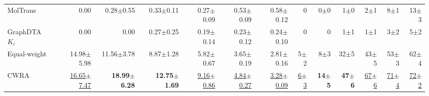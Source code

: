 \begin{table}[htbp!]
\begin{tabular}{lrrrrrr|rrrrrr}
MolTrans & 0.00 & 0.28$\pm$0.55 & 0.33$\pm$0.11 & 0.27$\pm$0.09 & 0.53$\pm$0.09 & 0.58$\pm$0.12 & 0 & 0$\pm$0 & 1$\pm$0 & 2$\pm$1 & 8$\pm$1 & 13$\pm$3 \\
GraphDTA $K_{i}$ & 0.00 & 0.00 & 0.27$\pm$0.25 & 0.19$\pm$0.14 & 0.23$\pm$0.12 & 0.24$\pm$0.10 & 0 & 0 & 1$\pm$1 & 1$\pm$1 & 3$\pm$2 & 5$\pm$2 \\
\midrule
Equal-weight & 14.98$\pm$5.98 & 11.56$\pm$3.78 & 8.87$\pm$1.28 & 5.82$\pm$0.67 & 3.65$\pm$0.19 & 2.81$\pm$0.16 & 5$\pm$2 & 8$\pm$3 & 32$\pm$5 & 43$\pm$5 & 53$\pm$3 & 62$\pm$4 \\
CWRA & \underline{16.65$\pm$7.47} & \textbf{18.99$\pm$6.28} & \textbf{12.75$\pm$1.69} & \underline{9.16$\pm$0.86} & \underline{4.84$\pm$0.27} & \underline{3.28$\pm$0.09} & \underline{6$\pm$3} & \textbf{14$\pm$5} & \textbf{47$\pm$6} & \underline{67$\pm$6} & \underline{71$\pm$4} & \underline{72$\pm$2} \\
\bottomrule
\end{tabular}
\end{table}